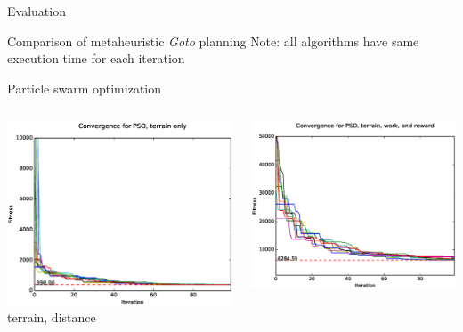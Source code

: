\documentclass[9pt]{beamer}
\begin{document}
\begin{frame}{Evaluation}
    \begin{block}{Comparison of metaheuristic \textit{Goto} planning}
    \small{Note: all algorithms have same execution time for each iteration}
    \end{block}
    \begin{block}{Particle swarm optimization}
        \begin{columns}
            \begin{column}{0.5\textwidth}
                \begin{center}
                    \includegraphics[width=\textwidth,trim={.75cm .75cm 0cm 1cm},clip]{img/conv_PSO_a.eps}
                    \linebreak
                    terrain, distance
                \end{center}
            \end{column}
            \begin{column}{0.5\textwidth}
                \begin{center}
                    \includegraphics[width=\textwidth,trim={.75cm .75cm 0cm 1cm},clip]{img/conv_PSO_b.eps}

\end{center}
\end{column}
\end{columns}
\end{block}
\end{frame}
\end{document}
